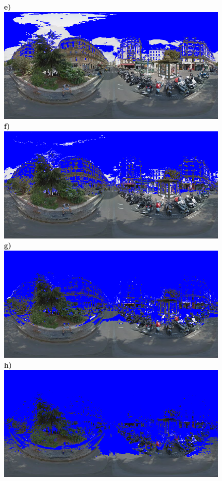 \documentclass{article}
\begin{document}
\begin{figure}
\textbf{\scriptsize{e)}}\includegraphics[scale=0.24]{Images/2/panorama-JtVHmEl7WCiz1xJ0bcJpBg-1_Sobel_80_marked.png} 
\textbf{\scriptsize{f)}}\includegraphics[scale=0.24]{Images/2/panorama-JtVHmEl7WCiz1xJ0bcJpBg-1_Sobel_70_marked.png} 
\textbf{\scriptsize{g)}}\includegraphics[scale=0.24]{Images/2/panorama-JtVHmEl7WCiz1xJ0bcJpBg-1_Sobel_60_marked.png} 
\textbf{\scriptsize{h)}}\includegraphics[scale=0.24]{Images/2/panorama-JtVHmEl7WCiz1xJ0bcJpBg-1_Sobel_50_marked.png} 

\end{figure}
\end{document}
